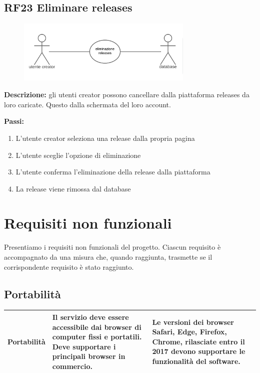 \documentclass[a4paper,12pt]{article}
\begin{document}
\subsection*{RF23 Eliminare releases}

\begin{figure}[htp]
    \centering
    \includegraphics[width=0.75\textwidth]{diagrams/use-case-23.png}
\end{figure}

\textbf{Descrizione:} gli utenti creator possono cancellare dalla piattaforma releases da loro caricate. Questo dalla schermata del loro account.

\textbf{Passi:}
\begin{enumerate}
    \item L’utente creator seleziona una release dalla propria pagina
    \item L'utente sceglie l’opzione di eliminazione
    \item L'utente conferma l’eliminazione della release dalla piattaforma
    \item La release viene rimossa dal database    
\end{enumerate}

\newpage
\section{Requisiti non funzionali}

Presentiamo i requisiti non funzionali del progetto. Ciascun requisito è accompagnato da una misura che, quando raggiunta, trasmette se il corrispondente requisito è stato raggiunto.

\subsection*{Portabilità}

{
    \centering
    \begin{tabularx}{\textwidth}{|l|>{\raggedright\arraybackslash}X|>{\raggedright\arraybackslash}X|>{\raggedright\arraybackslash}X|}
    \hline
    Portabilità & Il servizio deve essere accessibile dai browser di computer fissi e portatili. Deve supportare i principali browser in commercio. & Le versioni dei browser Safari, Edge, Firefox, Chrome, rilasciate entro il 2017 devono supportare le funzionalità del software. \\
    \hline
    \end{tabularx} \par
}
\end{document}
